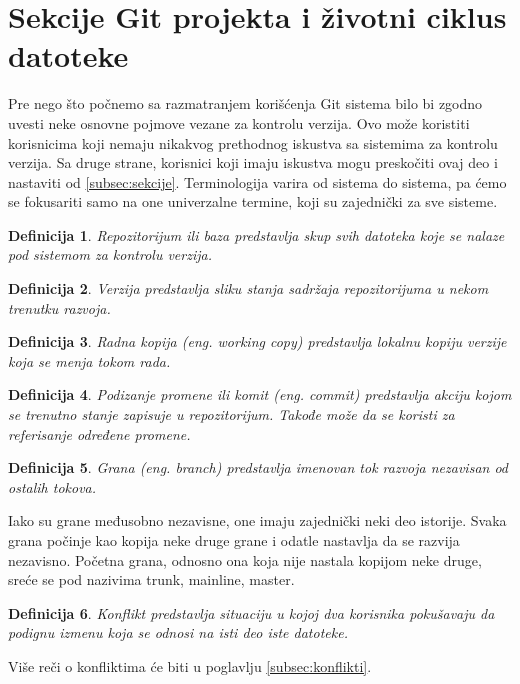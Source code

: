 \documentclass[a4paper]{article}
\newtheorem{definicija}{Definicija}[section]
\begin{document}
{\section{Sekcije Git projekta i životni ciklus datoteke}
\label{zivotni_ciklus}
Pre nego što počnemo sa razmatranjem korišćenja Git sistema bilo bi zgodno uvesti neke osnovne pojmove vezane za kontrolu verzija. Ovo može koristiti korisnicima koji nemaju nikakvog prethodnog iskustva sa sistemima za kontrolu verzija. Sa druge strane, korisnici koji imaju iskustva mogu preskočiti ovaj deo i nastaviti od \ref{subsec:sekcije}. Terminologija varira od sistema do sistema, pa ćemo se fokusariti samo na one univerzalne termine, koji su zajednički za sve sisteme.

\begin{definicija}
Repozitorijum ili baza predstavlja skup svih datoteka koje se nalaze pod sistemom za kontrolu verzija.
\end{definicija}

\begin{definicija}
Verzija predstavlja sliku stanja sadržaja repozitorijuma u nekom trenutku razvoja.
\end{definicija}

\begin{definicija}
Radna kopija (eng. working copy) predstavlja lokalnu kopiju verzije koja se menja tokom rada.
\end{definicija}

\begin{definicija}
Podizanje promene ili komit (eng. commit) predstavlja akciju kojom se trenutno stanje zapisuje u repozitorijum. Takođe može da se koristi za referisanje određene promene.
\end{definicija}

\begin{definicija}
Grana (eng. branch) predstavlja imenovan tok razvoja nezavisan od ostalih tokova.
\end{definicija}
Iako su grane međusobno nezavisne, one imaju zajednički neki deo istorije. Svaka grana počinje kao kopija neke druge grane i odatle nastavlja da se razvija nezavisno. Početna grana, odnosno ona koja nije nastala kopijom neke druge, sreće se pod nazivima trunk, mainline, master.

\begin{definicija}
Konflikt predstavlja situaciju u kojoj dva korisnika pokušavaju da podignu izmenu koja se odnosi na isti deo iste datoteke.
\end{definicija}
Više reči o konfliktima će biti u poglavlju \ref{subsec:konflikti}.


}
\end{document}
